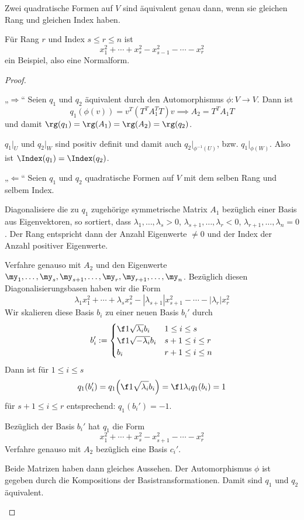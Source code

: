 \documentclass[a4paper, 10pt]{scrbook}
\begin{document}
\begin{thm}
	\label{thm:15.10}
	Zwei quadratische Formen auf $V$ sind äquivalent genau dann, wenn sie gleichen Rang und gleichen Index haben.
	\begin{note}
		Für Rang $r$ und Index $s \le r \le n$ ist
		\[
			x_1^2 + \dotsb + x_s^2 - x_{s-1}^2 - \dotsb - x_r^2
		\]
		ein Beispiel, also eine Normalform.
	\end{note}
	\begin{proof}
		\begin{seg}{„$\Longrightarrow$“}
			Seien $q_1$ und $q_2$ äquivalent durch den Automorphismus $\phi: V \to V$.
			Dann ist
			\[
				q_1(\phi(v)) = v^T(T^TA_1^TT)v  \implies A_2 = T^TA_1T
			\]
			und damit $\rg(q_1) = \rg(A_1) = \rg(A_2) = \rg(q_2)$.
			
			$q_1|_U$ und $q_2|_W$ sind positiv definit und damit auch $q_2|_{\phi^{-1}(U)}$, bzw. $q_1|_{\phi(W)}$.
			Also ist $\Index(q_1) = \Index(q_2)$.
		\end{seg}
		\begin{seg}{„$\Longleftarrow$“}
			Seien $q_1$ und $q_2$ quadratische Formen auf $V$ mit dem selben Rang und selbem Index.

			Diagonalisiere die zu $q_1$ zugehörige symmetrische Matrix $A_1$ bezüglich einer Basis aus Eigenvektoren, so sortiert, dass $\lambda_1, \dotsc, \lambda_s > 0$, $\lambda_{s+1},\dotsc,\lambda_r < 0$, $\lambda_{r+1},\dotsc,\lambda_n = 0$.
			Der Rang entspricht dann der Anzahl Eigenwerte $\neq 0$ und der Index der Anzahl positiver Eigenwerte.

			Verfahre genauso mit $A_2$ und den Eigenwerte $\my_1,\dotsc,\my_s,\my_{s+1},\dotsc,\my_{r},\my_{r+1},\dotsc,\my_{n}$.
			Bezüglich diesen Diagonalisierungsbasen haben wir die Form
			\[
				\lambda_1x_1^2 + \dotsb + \lambda_sx_s^2 - |\lambda_{s+1}|x_{s+1}^2 - \dotsb - |\lambda_r|x_r^2
			\]
			Wir skalieren diese Basis $b_i$ zu einer neuen Basis $b_i'$ durch
			\[
				b_i' := \begin{cases} \f 1{\sqrt{\lambda_i}}b_i & 1\le i \le s\\
					\f 1{\sqrt{-\lambda_i}} b_i & s+1\le i\le r\\
					b_i & r+1 \le i \le n
				\end{cases}
			\]
			Dann ist für $1\le i \le s$
			\[
				q_1(b_i') =  q_1\Big( \f 1{\sqrt{\lambda_i}} b_i\Big) = \f 1{\lambda_i} q_1(b_i) = 1
			\]
			für $s+1\le i \le r$ entsprechend: $q_1(b_i') = -1$.

			Bezüglich der Basis $b_i'$ hat $q_1$ die Form
			\[
				x_1^2 + \dotsb + x_s^2 - x_{s+1}^2 - \dotsb - x_r^2
			\]
			Verfahre genauso mit $A_2$ bezüglich eine Basis $c_i'$.

			Beide Matrizen haben dann gleiches Aussehen.
			Der Automorphismus $\phi$ ist gegeben durch die Kompositions der Basistransformationen.
			Damit sind $q_1$ und $q_2$ äquivalent.
		\end{seg}
	\end{proof}
\end{thm}
\end{document}
